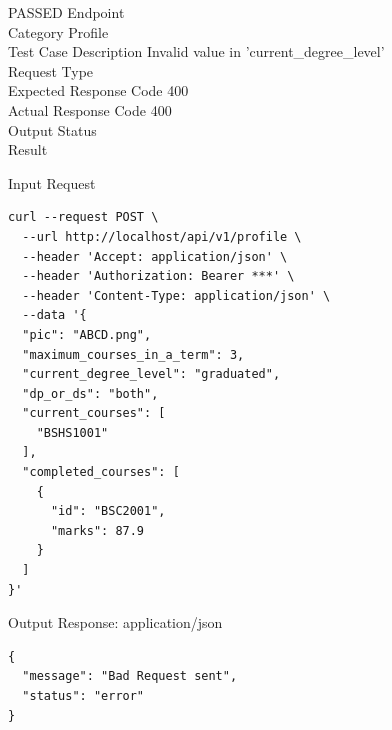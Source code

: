 \begin{testcase}{13}{PASSED}
Endpoint \hfill {}\\
Category \hfill Profile\\
Test Case Description \hfill Invalid value in 'current\_degree\_level'\\

Request Type    \hfill {}\\
Expected Response Code    \hfill 400\\
Actual Response Code    \hfill 400\\

Output Status \hfill {}\\
Result \hfill {}

\begin{ipblock}{Input Request}
\begin{verbatim}
curl --request POST \
  --url http://localhost/api/v1/profile \
  --header 'Accept: application/json' \
  --header 'Authorization: Bearer ***' \
  --header 'Content-Type: application/json' \
  --data '{
  "pic": "ABCD.png",
  "maximum_courses_in_a_term": 3,
  "current_degree_level": "graduated",
  "dp_or_ds": "both",
  "current_courses": [
    "BSHS1001"
  ],
  "completed_courses": [
    {
      "id": "BSC2001",
      "marks": 87.9
    }
  ]
}'
\end{verbatim}
\end{ipblock}

\begin{opblock}{Output Response: application/json}
\begin{verbatim}
{
  "message": "Bad Request sent",
  "status": "error"
}
\end{verbatim}
\end{opblock}
\end{testcase}


